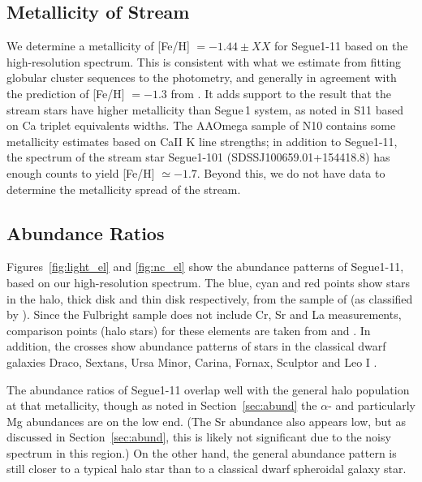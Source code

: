 \documentclass{emulateapj}
\begin{document}
\subsection{Metallicity of Stream}
We determine a metallicity of [Fe/H] $= -1.44 \pm XX $ for Segue1-11 based on the high-resolution spectrum. This is consistent with what we estimate from fitting globular cluster sequences to the photometry, and generally in agreement with the prediction of [Fe/H] $= -1.3$ from \citet{Simon2011}. It adds support to the result that the stream stars have higher metallicity than Segue\,1 system, as noted in S11 based on Ca triplet equivalents widths. The AAOmega sample of N10 contains some metallicity estimates based on CaII K line strengths; in addition to Segue1-11, the spectrum of the stream star Segue1-101 (SDSSJ100659.01+154418.8) has enough counts to yield [Fe/H] $\simeq -1.7$. Beyond this, we do not have data to determine the metallicity spread of the stream. 


\subsection{Abundance Ratios}
\label{sec:ab_rat}
Figures~\ref{fig:light_el} and \ref{fig:nc_el} show the abundance patterns of Segue1-11, based on our high-resolution spectrum. The blue, cyan and red points show stars in the halo, thick disk and thin disk respectively, from the sample of \citet{Fulbright2000, Fulbright2002} (as classified by \citealt{Venn2004}). Since the Fulbright sample does not include Cr, Sr and La measurements, comparison points  (halo stars) for these elements are taken from \citet{Lai2007} and \citet{Barklem2005}. In addition, the crosses show abundance patterns of stars in the classical dwarf galaxies Draco, Sextans, Ursa Minor, Carina, Fornax, Sculptor and Leo I \citep{Shetrone2001, Shetrone2003, Geisler2005, Aoki2009, Cohen2009}.

The abundance ratios of Segue1-11 overlap well with the general halo population at that metallicity, though as noted in Section~\ref{sec:abund} the $\alpha$- and particularly Mg abundances are on the low end. (The Sr abundance also appears low, but as discussed in Section~\ref{sec:abund}, this is likely not significant due to the noisy spectrum in this region.) On the other hand, the general abundance pattern is still closer to a typical halo star than to a classical dwarf spheroidal galaxy star. 
\end{document}
